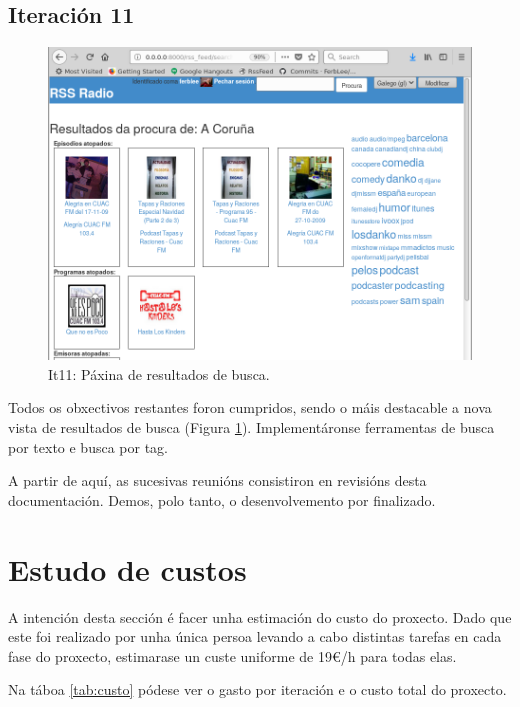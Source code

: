 \subsection{Iteración 11}

\begin{figure}[H]
	\centering
	\includegraphics[scale=0.4,keepaspectratio=true]{./images/procura_final.png}
	\caption{It11: Páxina de resultados de busca.}
	\label{fig:procura_final}
\end{figure}

Todos os obxectivos restantes foron cumpridos, sendo o máis destacable a nova vista de resultados de busca (Figura \ref{fig:procura_final}). Implementáronse ferramentas de busca por texto e busca por tag.

A partir de aquí, as sucesivas reunións consistiron en revisións desta documentación. Demos, polo tanto, o desenvolvemento por finalizado.



\section{Estudo de custos}

A intención desta sección é facer unha estimación do custo do proxecto. Dado que este foi realizado por unha única persoa levando a cabo distintas tarefas en cada fase do proxecto, estimarase un custe uniforme de 19€/h para todas elas. 

Na táboa \ref{tab:custo} pódese ver o gasto por iteración e o custo total do proxecto.

